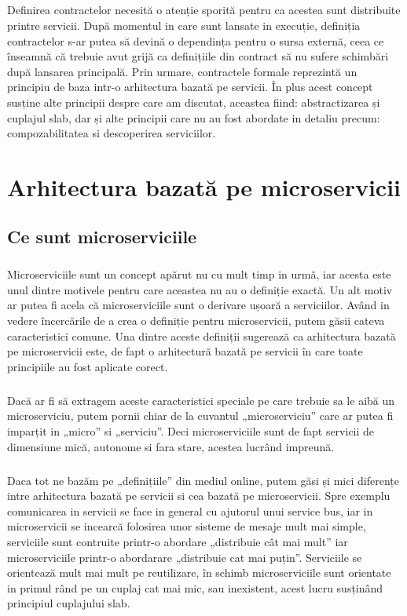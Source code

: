 \documentclass[12pt]{report}
\begin{document}
  	\paragraph{}Definirea contractelor necesită o atenție sporită pentru ca acestea sunt distribuite printre servicii. După momentul in care sunt lansate in execuție, definiția contractelor s-ar putea să devină o dependința pentru o sursa externă, ceea ce înseamnă că trebuie avut grijă ca definițiile din contract să nu sufere schimbări după lansarea principală. Prin urmare, contractele formale reprezintă un principiu de baza intr-o arhitectura bazată pe servicii. În plus acest concept susține alte principii despre care am discutat, aceastea fiind: abstractizarea și cuplajul slab, dar și alte principii care nu au fost abordate in detaliu precum: compozabilitatea si descoperirea serviciilor. \cite{erl2}
\chapter{Arhitectura bazată pe microservicii}
	\section{Ce sunt microserviciile}
	\paragraph{}Microserviciile sunt un concept apărut nu cu mult timp in urmă, iar acesta este unul dintre motivele pentru care aceastea nu au o definiție exactă. Un alt motiv ar putea fi acela că microserviciile sunt o derivare ușoară a serviciilor. Având in vedere încercările de a crea o definiție pentru microservicii, putem găsii cateva caracteristici comune. Una dintre aceste definiții sugerează ca arhitectura bazată pe microservicii este, de fapt o arhitectură bazată pe servicii în care toate principiile au fost aplicate corect.
	\paragraph{}Dacă ar fi să extragem aceste caracteristici speciale pe care trebuie sa le aibă un microserviciu, putem pornii chiar de la cuvantul „microserviciu” care ar putea fi imparțit in „micro” si „serviciu”. Deci microserviciile sunt de fapt servicii de dimensiune mică, autonome si fara stare, acestea lucrând impreună. 
	\paragraph{}Daca tot ne bazăm pe „definițiile” din mediul online, putem găsi și mici diferențe intre arhitectura bazată pe servicii si cea bazată pe microservicii. Spre exemplu comunicarea in servicii se face in general cu ajutorul unui service bus, iar in microservicii se incearcă folosirea unor sisteme de mesaje mult mai simple, serviciile sunt contruite printr-o abordare „distribuie cât mai mult” iar microserviciile printr-o abordarare „distribuie cat mai puțin”. Serviciile se orientează mult mai mult pe reutilizare, în schimb microserviciile sunt orientate in primul rând pe un cuplaj cat mai mic, sau inexistent, acest lucru susținând principiul cuplajului slab.
\end{document}
